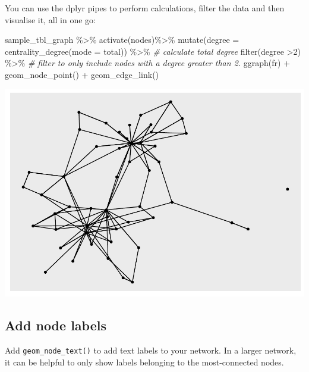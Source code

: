 \documentclass[
]{book}
\newenvironment{Shaded}{\begin{snugshade}}{\end{snugshade}}
\newcommand{\AttributeTok}[1]{\textcolor[rgb]{0.77,0.63,0.00}{#1}}
\newcommand{\CommentTok}[1]{\textcolor[rgb]{0.56,0.35,0.01}{\textit{#1}}}
\newcommand{\DecValTok}[1]{\textcolor[rgb]{0.00,0.00,0.81}{#1}}
\newcommand{\FunctionTok}[1]{\textcolor[rgb]{0.00,0.00,0.00}{#1}}
\newcommand{\NormalTok}[1]{#1}
\newcommand{\SpecialCharTok}[1]{\textcolor[rgb]{0.00,0.00,0.00}{#1}}
\newcommand{\StringTok}[1]{\textcolor[rgb]{0.31,0.60,0.02}{#1}}
\begin{document}
You can use the dplyr pipes to perform calculations, filter the data and then visualise it, all in one go:

\begin{Shaded}
\begin{Highlighting}[]
\NormalTok{sample\_tbl\_graph }\SpecialCharTok{\%\textgreater{}\%} 
  \FunctionTok{activate}\NormalTok{(nodes)}\SpecialCharTok{\%\textgreater{}\%} 
  \FunctionTok{mutate}\NormalTok{(}\AttributeTok{degree =} \FunctionTok{centrality\_degree}\NormalTok{(}\AttributeTok{mode =} \StringTok{\textquotesingle{}total\textquotesingle{}}\NormalTok{)) }\SpecialCharTok{\%\textgreater{}\%} \CommentTok{\# calculate total degree }
  \FunctionTok{filter}\NormalTok{(degree }\SpecialCharTok{\textgreater{}}\DecValTok{2}\NormalTok{) }\SpecialCharTok{\%\textgreater{}\%} \CommentTok{\# filter to only include nodes with a degree greater than 2.}
  \FunctionTok{ggraph}\NormalTok{(}\StringTok{\textquotesingle{}fr\textquotesingle{}}\NormalTok{) }\SpecialCharTok{+} 
  \FunctionTok{geom\_node\_point}\NormalTok{() }\SpecialCharTok{+} 
  \FunctionTok{geom\_edge\_link}\NormalTok{()}
\end{Highlighting}
\end{Shaded}

\includegraphics{_main_files/figure-latex/unnamed-chunk-64-1.pdf}

\hypertarget{add-node-labels}{%
\subsection{Add node labels}\label{add-node-labels}}

Add \texttt{geom\_node\_text()} to add text labels to your network. In a larger network, it can be helpful to only show labels belonging to the most-connected nodes.
\end{document}
